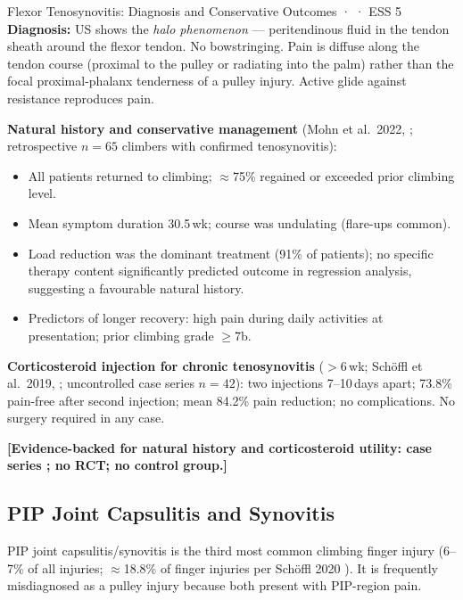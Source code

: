\begin{evidencebox}{Flexor Tenosynovitis: Diagnosis and Conservative Outcomes · \evidencebacked · ESS 5}
\textbf{Diagnosis:} US shows the \textit{halo phenomenon} --- peritendinous fluid in the tendon sheath around the flexor tendon. No bowstringing. Pain is diffuse along the tendon course (proximal to the pulley or radiating into the palm) rather than the focal proximal-phalanx tenderness of a pulley injury. Active glide against resistance reproduces pain.

\textbf{Natural history and conservative management} (Mohn et al.\ 2022, \cite{MSM+22}; retrospective $n=65$ climbers with confirmed tenosynovitis):
\begin{itemize}[leftmargin=1.5em,noitemsep]
  \item All patients returned to climbing; ${\approx}$75\% regained or exceeded prior climbing level.
  \item Mean symptom duration 30.5\,wk; course was undulating (flare-ups common).
  \item Load reduction was the dominant treatment (91\% of patients); no specific therapy content significantly predicted outcome in regression analysis, suggesting a favourable natural history.
  \item Predictors of longer recovery: high pain during daily activities at presentation; prior climbing grade $\geq$7b.
\end{itemize}

\textbf{Corticosteroid injection for chronic tenosynovitis} ($>$6\,wk; Sch\"{o}ffl et al.\ 2019, \cite{SSL19}; uncontrolled case series $n=42$): two injections 7--10\,days apart; 73.8\% pain-free after second injection; mean 84.2\% pain reduction; no complications. No surgery required in any case.

\textbf{[Evidence-backed for natural history and corticosteroid utility: case series \cite{MSM+22,SSL19}; no RCT; no control group.]}
\end{evidencebox}

\subsection{PIP Joint Capsulitis and Synovitis}
\label{subsec:capsulitis}

PIP joint capsulitis/synovitis is the third most common climbing finger injury (6--7\% of all injuries; $\approx$18.8\% of finger injuries per Sch\"{o}ffl 2020 \cite{SSF+20}). It is frequently misdiagnosed as a pulley injury because both present with PIP-region pain.

